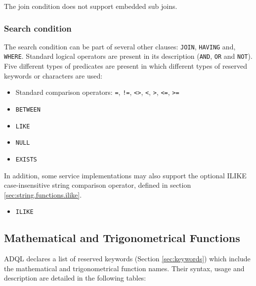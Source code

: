 \documentclass[11pt,a4paper]{ivoa}
\begin{document}
The join condition does not support embedded sub joins.

\subsubsection{Search condition}
\label{sec:search}

The search condition can be part of several other clauses: \verb:JOIN:, \verb:HAVING: and,
\verb:WHERE:. Standard logical operators are present in its description
(\verb:AND:, \verb:OR: and \verb:NOT:). Five different types of predicates are present in which
different types of reserved keywords or characters are used:

\begin{itemize}
    \item Standard comparison operators: \verb:=:, \verb:!=:, \verb:<>:, \verb:<:, \verb:>:, \verb:<=:, \verb:>=:
    \item \verb:BETWEEN:
    \item \verb:LIKE:
    \item \verb:NULL:
    \item \verb:EXISTS:
\end{itemize}

In addition, some service implementations may also support the optional
ILIKE case-insensitive string comparison operator, defined in section \ref{sec:string.functions.ilike}.

\begin{itemize}
    \item \verb:ILIKE:
\end{itemize}

\clearpage
\subsection{Mathematical and Trigonometrical Functions}
\label{sec:math.functions}

ADQL declares a list of reserved keywords (Section \ref{sec:keywords}) which include
the mathematical and trigonometrical function names. Their syntax,
usage and description are detailed in the following tables:
\end{document}
